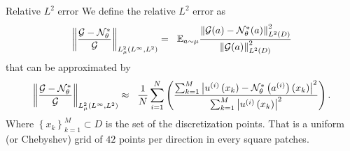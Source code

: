 \documentclass{beamer}
\newcommand{\numberset}{\mathbb}
\newcommand{\Z}{\numberset{Z}}
\begin{document}

\begin{frame}{Relative $ L^2 $ error}
	We define the relative $ L^2 $ error as
	\[ \left\| \frac{\mathcal{G} - \mathcal{N}^{*}_{\theta}}{\mathcal{G}}\right\|_{L_{\mu}^2(L^{\infty}, L^{2})} = 	\hspace{0.2cm}\mathbb{E}_{a \sim \mu} \frac{\left\| \mathcal{G}(a) - \mathcal{N}^{*}_{\theta}(a) \right\|^{2}_{L^2(D)}}{\left\| \mathcal{G}(a)\right\|^{2}_{L^2(D)}} \]
	that can be approximated by
	\[\left\| \frac{\mathcal{G} - \mathcal{N}^{*}_{\theta}}{\mathcal{G}}\right\|_{L_{\mu}^2(L^{\infty}, L^{2})} \approx \hspace{0.2cm} \frac1N \sum_{i=1}^{N}\left(  \frac{\sum_{k=1}^{M} \left| u^{(i)}\left( x_k\right)  - \mathcal{N}^{*}_{\theta}\left(a^{(i)}\right)\left( x_k\right)  \right|^{2}}{\sum_{k=1}^{M}\left| u^{(i)}\left( x_k\right)  \right|^{2}}\right). \]
	Where $ \left\lbrace x_{k} \right\rbrace_{k = 1}^{M} \subset D $ is the set of the discretization points. That is a uniform (or Chebyshev) grid of $42$ points per direction in every square patches.
\end{frame}



\end{document}
